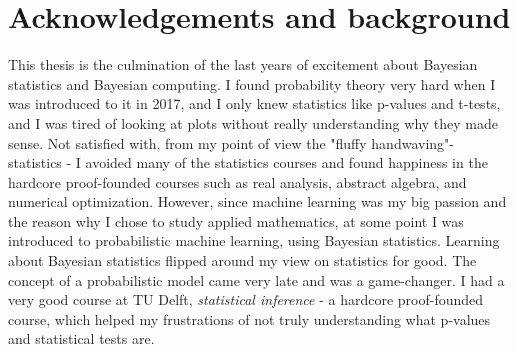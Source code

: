 \section*{Acknowledgements and background}

This thesis is the culmination of the last years of excitement about Bayesian statistics and Bayesian
computing. I found probability theory very hard when I was introduced to it in 2017, and I only knew
statistics like p-values and t-tests, and I was tired of looking at plots without really understanding
why they made sense. Not satisfied with, from my point of view the "fluffy handwaving"- statistics - I
avoided many of the statistics courses and found happiness in the hardcore proof-founded courses such as
real analysis, abstract algebra, and numerical optimization. However, since machine learning was my big
passion and the reason why I chose to study applied mathematics, at some point I was introduced to
probabilistic machine learning, using Bayesian statistics. Learning about Bayesian statistics
flipped around my view on statistics for good. The concept of a probabilistic model came very late and
was a game-changer. I had a very good course at TU Delft, \textit{statistical inference} - a hardcore
proof-founded course, which helped my frustrations of not truly understanding what p-values and
statistical tests are.



